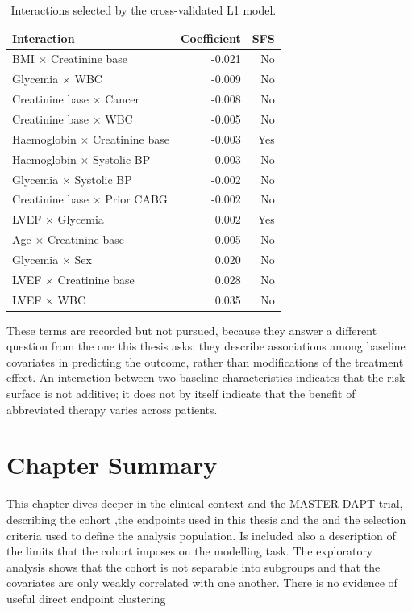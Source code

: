 \begin{table}[h]
\centering
\caption{Interactions selected by the cross-validated L1 model.}
\label{tab:selected_interactions}
\begin{tabular}{lrr}
\hline
\textbf{Interaction} & \textbf{Coefficient} & \textbf{SFS} \\
\hline
BMI $\times$ Creatinine base & -0.021 & No \\
Glycemia $\times$ WBC & -0.009 & No \\
Creatinine base $\times$ Cancer & -0.008 & No \\
Creatinine base $\times$ WBC & -0.005 & No \\
Haemoglobin $\times$ Creatinine base & -0.003 & Yes \\
Haemoglobin $\times$ Systolic BP & -0.003 & No \\
Glycemia $\times$ Systolic BP & -0.002 & No \\
Creatinine base $\times$ Prior CABG & -0.002 & No \\
LVEF $\times$ Glycemia & 0.002 & Yes \\
Age $\times$ Creatinine base & 0.005 & No \\
Glycemia $\times$ Sex & 0.020 & No \\
LVEF $\times$ Creatinine base & 0.028 & No \\
LVEF $\times$ WBC & 0.035 & No \\
\hline
\end{tabular}
\end{table}

These terms are recorded but not pursued, because they answer a different question 
from the one this thesis asks: they describe associations among baseline covariates 
in predicting the outcome, rather than modifications of the treatment effect. 
An interaction between two baseline characteristics indicates that the risk surface is 
not additive; it does not by itself indicate that the benefit of abbreviated therapy varies across patients.


\section{Chapter Summary}
This chapter dives deeper in the clinical context and the MASTER DAPT trial, describing the cohort
,the endpoints used in this thesis and the and the selection criteria used to define
the analysis population.
Is included also a description of the limits that the cohort imposes on the modelling task.
The exploratory analysis shows that the cohort is not separable into subgroups and that the covariates 
are only weakly correlated with one another. There is no evidence of useful direct endpoint clustering 

